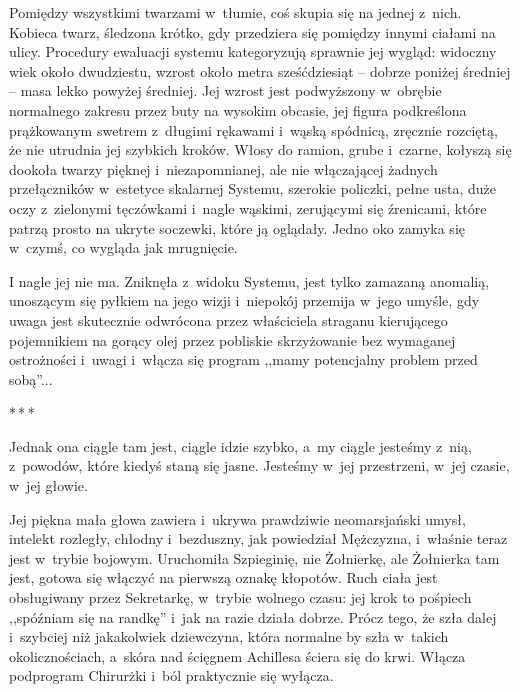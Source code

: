 \documentclass[oneside,polish,11pt,sfheadings]{mwbk}
\newcommand{\threeast}{\bigskip\par\centerline{*\,*\,*}\medskip\par}
\begin{document}
Pomiędzy wszystkimi twarzami w~tłumie, coś skupia się na jednej z~nich.
Kobieca twarz, śledzona krótko, gdy przedziera się pomiędzy innymi
ciałami na ulicy. Procedury ewaluacji systemu kategoryzują sprawnie jej
wygląd: widoczny wiek około dwudziestu, wzrost około metra sześćdziesiąt
-- dobrze poniżej średniej -- masa lekko powyżej średniej. Jej wzrost jest
podwyższony w~obrębie normalnego zakresu przez buty na wysokim obcasie,
jej figura podkreślona prążkowanym swetrem z~długimi rękawami i~wąską
spódnicą, zręcznie rozciętą, że nie utrudnia jej szybkich kroków. Włosy
do ramion, grube i~czarne, kołyszą się dookoła twarzy pięknej i~niezapomnianej, ale nie włączającej żadnych przełączników w~estetyce
skalarnej Systemu, szerokie policzki, pełne usta, duże oczy z~zielonymi
tęczówkami i~nagle wąskimi, zerującymi się źrenicami, które patrzą
prosto na ukryte soczewki, które ją oglądały. Jedno oko zamyka się w~czymś, co wygląda jak mrugnięcie.

I nagle jej nie ma. Zniknęła z~widoku Systemu, jest tylko zamazaną
anomalią, unoszącym się pyłkiem na jego wizji i~niepokój przemija w~jego
umyśle, gdy uwaga jest skutecznie odwrócona przez właściciela straganu
kierującego pojemnikiem na gorący olej przez pobliskie skrzyżowanie bez
wymaganej ostrożności i~uwagi i~włącza się program ,,mamy potencjalny
problem przed sobą''...

\threeast

Jednak ona ciągle tam jest, ciągle idzie szybko, a~my ciągle jesteśmy z~nią, z~powodów, które kiedyś staną się jasne. Jesteśmy w~jej
przestrzeni, w~jej czasie, w~jej głowie.

Jej piękna mała głowa zawiera i~ukrywa prawdziwie neomarsjański umysł,
intelekt rozległy, chłodny i~bezduszny, jak powiedział Mężczyzna, i~właśnie teraz jest w~trybie bojowym. Uruchomiła Szpieginię, nie
Żołnierkę, ale Żołnierka tam jest, gotowa się włączyć na pierwszą oznakę
kłopotów. Ruch ciała jest obsługiwany przez Sekretarkę, w~trybie wolnego
czasu: jej krok to pośpiech ,,spóźniam się na randkę'' i~jak na razie
działa dobrze. Prócz tego, że szła dalej i~szybciej niż jakakolwiek
dziewczyna, która normalne by szła w~takich okolicznościach, a~skóra nad
ścięgnem Achillesa ściera się do krwi. Włącza podprogram Chirurżki i~ból
praktycznie się wyłącza.
\end{document}
